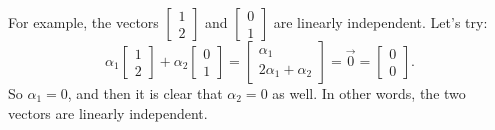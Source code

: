 For example, the vectors
$\left[ \begin{smallmatrix} 1 \\ 2 \end{smallmatrix} \right]$
and
$\left[ \begin{smallmatrix} 0 \\ 1 \end{smallmatrix} \right]$
are linearly independent.  Let's try:
\begin{equation*}
\alpha_1
\begin{bmatrix} 1 \\ 2 \end{bmatrix}
+
\alpha_2
\begin{bmatrix} 0 \\ 1 \end{bmatrix}
=
\begin{bmatrix} \alpha_1 \\ 2 \alpha_1 + \alpha_2 \end{bmatrix}
=
\vec{0} =
\begin{bmatrix} 0 \\ 0 \end{bmatrix} .
\end{equation*}
So $\alpha_1 = 0$, and then it is clear that $\alpha_2 = 0$ as well.  In
other words, the two vectors are linearly independent.

